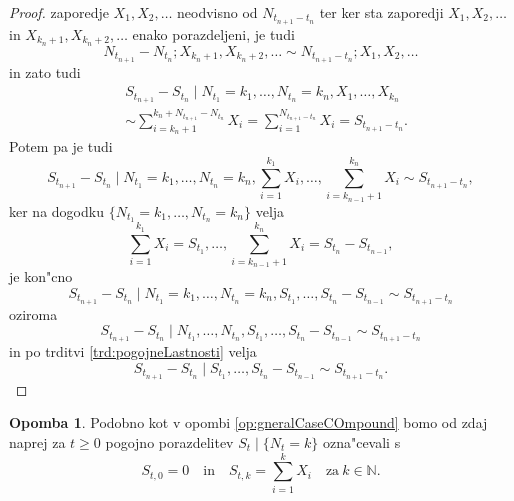 \documentclass[12pt, a4paper, reqno]{amsart}
\theoremstyle{definition}
\newtheorem{opomba}[definicija]{Opomba}
\theoremstyle{plain}
\newcommand{\N}{\mathbb{N}}
\newcommand{\1}{\mathds{1}}
\newcommand*{\refPriloga}[1]{%
  \begingroup
    \hypersetup{
      linkcolor=red,
      linkbordercolor=red,
    }%
    \ref{#1}%
  \endgroup
}
\begin{document}
\begin{proof}
            zaporedje $X_1, X_2, \dots$ neodvisno od $N_{t_{n+1} - t_n}$ ter ker sta zaporedji 
            $X_1, X_2, \dots$ in $X_{k_n + 1}, X_{k_n + 2}, \dots$ enako porazdeljeni, je tudi 
            \begin{equation*}
                N_{t_{n+1}} - N_{t_n}; X_{k_n + 1}, X_{k_n + 2}, \dots \sim N_{t_{n+1} - t_n}; X_1, X_2, \dots
            \end{equation*}
            in zato tudi 
            \begin{align*}
                &S_{t_{n+1}} - S_{t_n} \mid N_{t_1} = k_1, \dots, N_{t_n} = k_n, X_1, \dots, X_{k_n} \\
                &\sim \sum_{i = k_n + 1}^{k_n + N_{t_{n+1}} - N_{t_n}}X_i 
                = \sum_{i = 1}^{N_{t_{n+1} - t_n}}X_i = S_{t_{n+1} - t_n}.
            \end{align*}
            Potem pa je tudi
            \begin{equation*}
                S_{t_{n+1}} - S_{t_n}\mid N_{t_1} = k_1, \dots, N_{t_n} = k_n, \sum_{i=1}^{k_1}X_i, \dots, \sum_{i=k_{n-1} + 1}^{k_n}X_i \sim S_{t_{n+1} - t_n}, 
            \end{equation*}
            ker na dogodku $\{N_{t_1} = k_1, \dots, N_{t_n} = k_n\}$ velja 
            \begin{equation*}
                \sum_{i=1}^{k_1}X_i = S_{t_1}, \dots, \sum_{i=k_{n-1} + 1}^{k_n}X_i = S_{t_n} - S_{t_{n-1}},
            \end{equation*}
            je kon"cno 
            \begin{equation*}
                S_{t_{n+1}} - S_{t_n}\mid N_{t_1} = k_1, \dots, N_{t_n} = k_n, S_{t_1}, \dots, S_{t_n} - S_{t_{n-1}} \sim S_{t_{n+1} - t_n}
            \end{equation*}
            oziroma 
            \begin{equation*}
                S_{t_{n+1}} - S_{t_n}\mid N_{t_1}, \dots, N_{t_n}, S_{t_1}, \dots, S_{t_n} - S_{t_{n-1}} \sim S_{t_{n+1} - t_n}
            \end{equation*}
            in po trditvi \refPriloga{trd:pogojneLastnosti} velja
            \begin{equation*}
                S_{t_{n+1}} - S_{t_n}\mid S_{t_1}, \dots, S_{t_n} - S_{t_{n-1}} \sim S_{t_{n+1} - t_n}.
            \end{equation*}
        \end{proof}

        \begin{opomba}
            Podobno kot v opombi \ref{op:gneralCaseCOmpound} bomo od zdaj naprej za $t\geq0$  
            pogojno porazdelitev $S_t \mid \{N_t = k\}$ ozna"cevali s
            \begin{equation*}
                S_{t, 0} = 0 \quad \text{in} \quad S_{t, k} = \sum_{i=1}^kX_i \quad \text{za} \ k\in\N.
            \end{equation*}
        \end{opomba}
\end{document}
